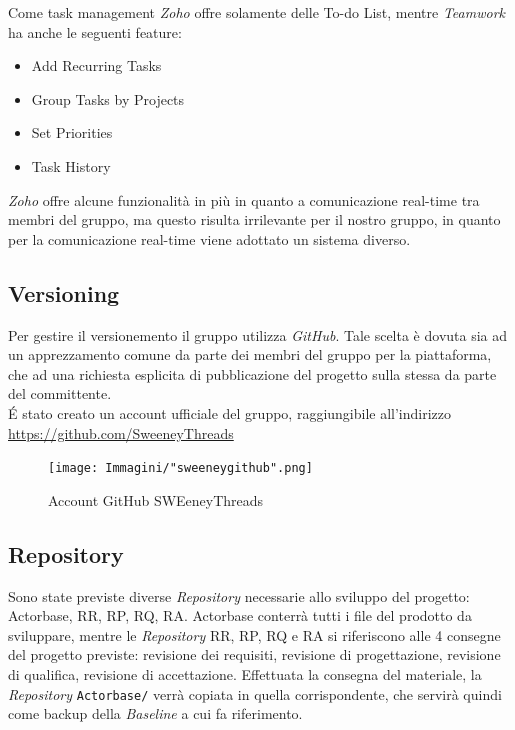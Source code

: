 \documentclass[a4paper]{report}
\begin{document}
	Come task management \emph{Zoho} offre solamente delle To-do List, mentre \emph{Teamwork} ha anche le seguenti
	feature:
	\begin{itemize}
		\item Add Recurring Tasks
		\item Group Tasks by Projects
		\item Set Priorities
		\item Task History
	\end{itemize}
	\emph{Zoho} offre alcune funzionalità in più in quanto a comunicazione real-time tra membri del gruppo,
	ma questo risulta irrilevante per il nostro gruppo, in quanto per la comunicazione real-time viene
	adottato un sistema diverso.
	\subsection{Versioning}
	Per gestire il versionemento il gruppo utilizza \emph{GitHub}. Tale scelta è dovuta sia ad un apprezzamento
	comune da parte dei membri del gruppo per la piattaforma, che ad una richiesta esplicita di pubblicazione del 
	progetto sulla stessa da parte del committente. \\
	\'E stato creato un account ufficiale del gruppo, raggiungibile all'indirizzo 
	\url{https://github.com/SweeneyThreads}
	\begin{figure}[h!]
		\centering
		\texttt{[image: Immagini/"sweeneygithub".png]}
		\caption{Account GitHub SWEeneyThreads}
	\end{figure}
	\subsection{Repository}
	Sono state previste diverse \emph{Repository} necessarie allo sviluppo del progetto: Actorbase, 
	RR, RP, RQ, RA. 	Actorbase conterrà tutti i file del prodotto da sviluppare, mentre le
	 \emph{Repository} RR, RP, RQ e RA si riferiscono alle 4 consegne del progetto previste: 
	 revisione dei requisiti, revisione di progettazione, revisione di qualifica, revisione di
	  accettazione. Effettuata la consegna del materiale, la \emph{Repository} 
	  \verb|Actorbase/| verrà copiata in quella corrispondente, che servirà quindi come 
	  backup della \emph{Baseline} a cui fa riferimento.
	
\end{document}
